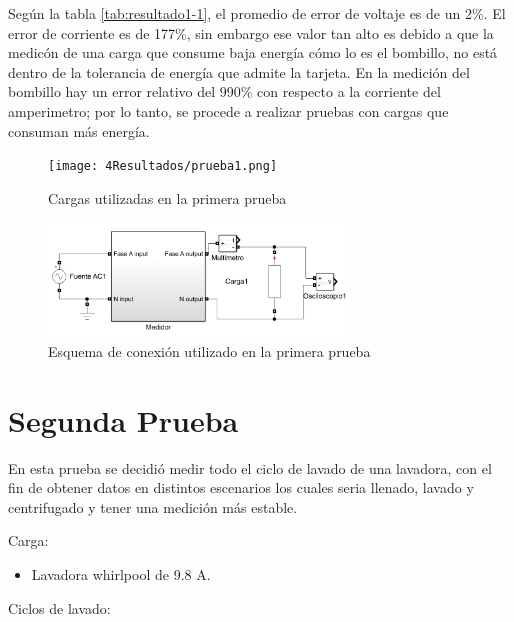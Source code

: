 Según la tabla \ref{tab:resultado1-1}, el promedio de error de voltaje es de un 2\%. El error de corriente es de 177\%, sin embargo ese valor tan alto es debido a que la medicón de una carga que consume baja energía cómo lo es el bombillo, no está dentro de la tolerancia de energía que admite la tarjeta. En la medición del bombillo hay un error relativo del 990\% con respecto a la corriente del amperimetro; por lo tanto, se procede a realizar pruebas con cargas que consuman más energía.
\begin{figure}[H]
  \begin{center}
      \texttt{[image: 4Resultados/prueba1.png]}
      \caption{ Cargas utilizadas en la primera prueba } 
      \label{fig:montaje1}
 \end{center}
\end{figure}
\begin{figure}[H]
  \begin{center}
      \includegraphics[width = 8cm]{4Resultados/conexion1.jpeg}
      \caption{ Esquema de conexión utilizado en la primera prueba } 
      \label{fig:conexion1}
 \end{center}
\end{figure}
  
\section{Segunda Prueba}
  
En esta prueba se decidió medir todo el ciclo de lavado de una lavadora, con el fin de obtener datos en distintos escenarios los cuales seria llenado, lavado y centrifugado y tener una medición más estable.

Carga:

\begin{itemize}
  \itemsep0em
  \item Lavadora whirlpool de 9.8 A.
\end{itemize}

Ciclos de lavado:

